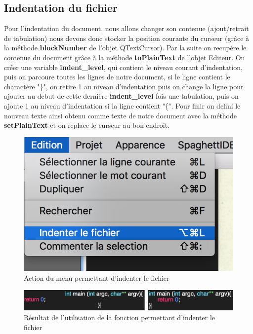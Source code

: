 \documentclass[a4paper,12pt]{article}
\begin{document}
\subsection{Indentation du fichier}

	Pour l'indentation du document, nous allons changer son contenue (ajout/retrait de tabulation) nous devons donc stocker la position courante du curseur (grâce à la méthode \textbf{blockNumber} de l'objet QTextCursor). Par la suite on recupère le contenue du document grâce à la méthode \textbf{toPlainText} de l'objet Editeur. On créer une variable \textbf{indent\_level}, qui contient le niveau courant d'indentation, puis on parcoure toutes les lignes de notre document, si le ligne contient le charactère "\}", on retire 1 au niveau d'indentation puis on change la ligne pour ajouter au debut de cette dernière \textbf{indent\_level} fois une tabulation, puis on ajoute 1 au niveau d'indentation si la ligne contient "\{".
	Pour finir on defini le nouveau texte ainsi obtenu comme texte de notre document avec la méthode \textbf{setPlainText} et on replace le curseur au bon endroit.

	\begin{figure}[h!]

		\begin{center}
			\includegraphics[scale=0.8]{images/imgs_edit/utilisation_indentation}
			\caption{Action du menu permettant d'indenter le fichier}
		\end{center}
	\end{figure}

	\begin{figure}[h!]
		\begin{center}
			\includegraphics[scale=0.8]{images/imgs_edit/resultat_indentation}
			\caption{Résultat de l'utilisation de la fonction permettant d'indenter le fichier}
		\end{center}
	\end{figure}
\end{document}
